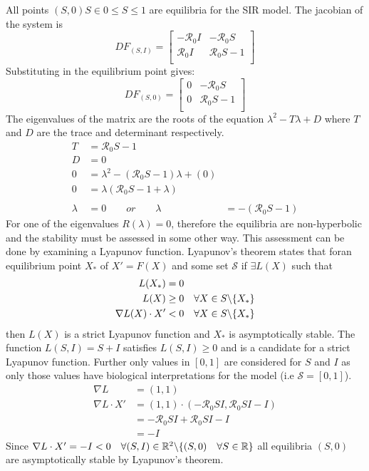 
All points $(S,0) S \in 0 \leq S \leq 1$ are equilibria for the SIR model.
The jacobian of the system is
$$ DF_{(S,I)} =
\begin{bmatrix}
    -{\mathcal R_0}I & -{\mathcal R_0}S\\
     {\mathcal R_0}I &  {\mathcal R_0}S - 1\\
\end{bmatrix} $$
Substituting in the equilibrium point gives:
$$ DF_{(S,0)} =
\begin{bmatrix}
    0 & -{\mathcal R_0}S\\
    0 &  {\mathcal R_0}S - 1\\
\end{bmatrix} $$
The eigenvalues of the matrix are the roots of the equation $\lambda^2 - T\lambda + D$ where $T$ and $D$ are the trace and determinant respectively.
\begin{align*}
    T &= {\mathcal R_0}S - 1\\
    D &= 0\\
    0 &= \lambda^2 - ({\mathcal R_0}S - 1)\lambda + (0)\\
    0 &= \lambda({\mathcal R_0}S - 1 + \lambda)\\\\
    \lambda &= 0\qquad or\qquad \lambda &= -({\mathcal R_0}S - 1)
\end{align*}
For one of the eigenvalues $R(\lambda) = 0$, therefore the equilibria are non-hyperbolic and the stability must be assessed in some other way.
This assessment can be done by examining a Lyapunov function.
Lyapunov's theorem states that foran equilibrium point $X_*$ of $X'=F(X)$ and some set ${\mathcal S}$ if $\exists L(X)$ such that
\begin{align*}
    L(X_*) &= 0\\
    L(X) &\geq 0\quad \forall X \in S\char`\\ \{X_*\}\\
    \nabla L(X) \cdot X' &< 0 \quad \forall X \in S\char`\\ \{X_*\}
\end{align*}
then $L(X)$ is a strict Lyapunov function and $X_*$ is asymptotically stable.
The function $L(S,I) = S + I$ satisfies $L(S,I) \geq 0$ and is a candidate for a strict Lyapunov function.
Further only values in $[0,1]$ are considered for $S$ and $I$ as only those values have biological interpretations for the model (i.e ${\mathcal S} = [0,1]$).
\begin{align*}
    \nabla L &= (1,1)\\
    \nabla L \cdot X' &= (1,1)\cdot(-{\mathcal R_0}SI,{\mathcal R_0}SI-I)\\
    &=-{\mathcal R_0}SI + {\mathcal R_0}SI-I\\
    &=-I
\end{align*}
Since $\nabla L \cdot X' = -I < 0\quad \forall (S,I) \in \mathbb{R}^2\char`\\ \{(S,0)\quad \forall S \in \mathbb{R}\}$ all equilibria $(S,0)$ are asymptotically stable by Lyapunov's theorem.
